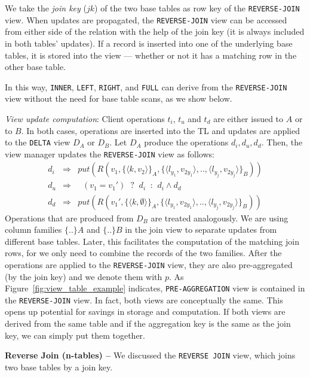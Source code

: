 We take the \textit{join key} ($jk$) of the two base tables as row key
of the \texttt{REVERSE-JOIN} view. When updates are propagated, the
\texttt{REVERSE-JOIN} view can be accessed from either side of the
relation with the help of the join key (it is always included in both
tables' updates). If a record is inserted into one of the underlying
base tables, it is stored into the view --- whether or not it has a
matching row in the other base table.

In this way, \texttt{INNER}, \texttt{LEFT}, \texttt{RIGHT}, and
\texttt{FULL} can derive from the \texttt{REVERSE-JOIN} view without
the need for base table scans, as we show below.

\noindent  
\textit{View update computation}: Client operations $t_i$, $t_u$ and
$t_d$ are either issued to $A$ or to $B$. In both cases, operations
are inserted into the TL and updates are applied to the \texttt{DELTA}
view $D_A$ or $D_B$. Let $D_A$ produce the operations $d_i, d_u, d_d$.
Then, the view manager updates the \texttt{REVERSE-JOIN} view as
follows:
%
\begin{eqnarray}
	d_i & \Rightarrow & put(R(v_1,\{\langle k,v_2\rangle\}_A, \{\langle l_{y_1},v_{2y_1}\rangle,..,\langle l_{y_j},v_{2y_j}\rangle\}_B))\\
	d_u & \Rightarrow & \;\; (v_1 = v_1') \;\; \texttt{?} \;\; d_i \;\; \texttt{:} \;\; d_i \land d_d\\ 
	d_d & \Rightarrow & put(R(v_1',\{\langle k,\emptyset\rangle\}_A, \{\langle l_{y_1},v_{2y_1}\rangle,..,\langle l_{y_j},v_{2y_j}\rangle\}_B))
\end{eqnarray}
% 
Operations that are produced from $D_B$ are treated analogously.
We are using column families $\{..\}A$ and $\{..\}B$ in the join view
to separate updates from different base tables. Later, this
facilitates the computation of the matching join rows, for we only
need to combine the records of the two families. After the operations
are applied to the \texttt{REVERSE-JOIN} view, they are also
pre-aggregated (by the join key) and we denote them with $p$. As 
Figure~\ref{fig:view_table_example} indicates, \texttt{PRE-AGGREGATION} 
view is contained in the \texttt{REVERSE-JOIN} view. In fact, both 
views are conceptually the same. This opens up
potential for savings in storage and computation. If both views are
derived from the same table and if the aggregation key is the same
as the join key, we can simply put them together. 



\noindent  
\textbf{Reverse Join (n-tables) --} We discussed the \texttt{REVERSE 
  JOIN} view, which joins two base tables by a join key.

